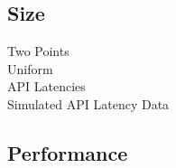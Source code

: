 \documentclass{article}
\theoremstyle{plain}
\theoremstyle{remark}
\begin{document}
\subsection{Size}


Two Points\\



Uniform\\



API Latencies\\



Simulated API Latency Data\\



\subsection{Performance}
\end{document}

